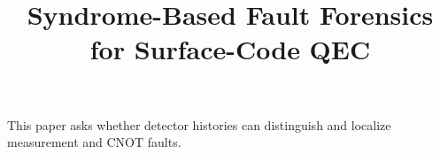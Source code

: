 \documentclass{article}
\begin{document}
\title{Syndrome-Based Fault Forensics for Surface-Code QEC}
\maketitle
This paper asks whether detector histories can distinguish and localize measurement and CNOT faults.
\end{document}
